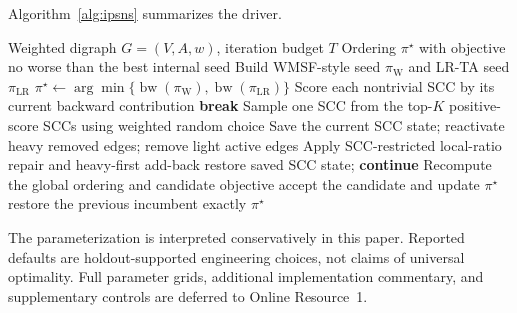 Algorithm~\ref{alg:ipsns} summarizes the driver.

\begin{algorithm}[t]
\caption{IPSNS with incumbent protection}
\label{alg:ipsns}
\footnotesize
\begin{algorithmic}[1]
\Require Weighted digraph \(G=(V,A,w)\), iteration budget \(T\)
\Ensure Ordering \(\pi^\star\) with objective no worse than the best internal seed
\State Build WMSF-style seed \(\pi_{\mathrm{W}}\) and LR-TA seed \(\pi_{\mathrm{LR}}\)
\State \(\pi^\star \gets \arg\min\{\operatorname{bw}(\pi_{\mathrm{W}}),\operatorname{bw}(\pi_{\mathrm{LR}})\}\)
    \State Score each nontrivial SCC by its current backward contribution
        \State \textbf{break}
    \EndIf
    \State Sample one SCC from the top-\(K\) positive-score SCCs using weighted random choice
    \State Save the current SCC state; reactivate heavy removed edges; remove light active edges
    \State Apply SCC-restricted local-ratio repair and heavy-first add-back
        \State restore saved SCC state; \textbf{continue}
    \EndIf
    \State Recompute the global ordering and candidate objective
        \State accept the candidate and update \(\pi^\star\)
    \Else
        \State restore the previous incumbent exactly
    \EndIf
\EndFor
\State \Return \(\pi^\star\)
\end{algorithmic}
\end{algorithm}

The parameterization is interpreted conservatively in this paper. Reported defaults are holdout-supported engineering choices, not claims of universal optimality. Full parameter grids, additional implementation commentary, and supplementary controls are deferred to Online Resource~1.


